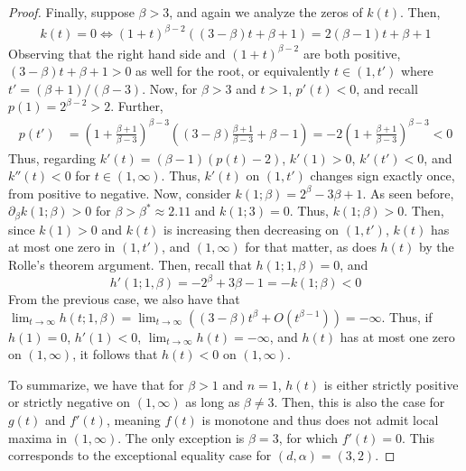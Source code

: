 \documentclass[10pt,a4paper]{amsart}
\newcommand{\p}{\partial}
\begin{document}
\begin{proof}
Finally, suppose $\beta>3$, and again we analyze the zeros of $k(t)$. Then, 
\begin{align*}
    k(t)=0\Leftrightarrow (1+t)^{\beta-2}((3-\beta)t+\beta+1)=2(\beta-1)t+\beta+1
\end{align*}
Observing that the right hand side and $(1+t)^{\beta-2}$ are both positive, $(3-\beta)t+\beta+1>0$ as well for the root, or equivalently $t\in (1,t')$ where $t'=(\beta+1)/(\beta-3)$. Now, for $\beta > 3$ and $t>1$, $p'(t)<0$, and recall $p(1)=2^{\beta-2}>2$. Further,
\begin{align*}
    p(t')&=\left(1+\frac{\beta+1}{\beta-3}\right)^{\beta-3}\left((3-\beta)\frac{\beta+1}{\beta-3}+\beta-1\right)=-2 \left(1+\frac{\beta+1}{\beta-3}\right)^{\beta-3}<0
\end{align*}
Thus, regarding $k'(t)=(\beta-1)(p(t)-2)$, $k'(1)>0$, $k'(t')<0$, and $k''(t)<0$ for $t\in (1,\infty)$. Thus, $k'(t)$ on $(1,t')$ changes sign exactly once, from positive to negative. Now, consider $k(1;\beta)=2^{\beta}-3\beta +1$. As seen before, $\p_\beta k(1;\beta)>0$ for $\beta > \beta^*\approx 2.11$ and $k(1;3)=0$. Thus, $k(1;\beta)>0$. Then, since $k(1)>0$ and $k(t)$ is increasing then decreasing on $(1,t')$, $k(t)$ has at most one zero in $(1,t')$, and $(1,\infty)$ for that matter, as does $h(t)$ by the Rolle's theorem argument. Then, recall that $h(1;1,\beta)=0$, and
$$h'(1;1,\beta)=-2^{\beta}+3\beta -1=-k(1;\beta)<0$$
From the previous case, we also have that $\lim_{t\to \infty}h(t;1,\beta)=\lim_{t\to \infty}((3-\beta)t^{\beta}+O(t^{\beta-1}))=-\infty$. Thus, if $h(1)=0$, $h'(1)<0$, $\lim_{t\to \infty}h(t)=-\infty$, and $h(t)$ has at most one zero on $(1,\infty)$, it follows that $h(t)<0$ on $(1,\infty)$.

To summarize, we have that for $\beta > 1$ and $n=1$, $h(t)$ is either strictly positive or strictly negative on $(1,\infty)$ as long as $\beta \neq 3$. Then, this is also the case for $g(t)$ and $f'(t)$, meaning $f(t)$ is monotone and thus does not admit local maxima in $(1,\infty)$. The only exception is $\beta =3$, for which $f'(t)=0$. This corresponds to the exceptional equality case for $(d,\alpha)=(3,2)$.
\end{proof}
\end{document}

